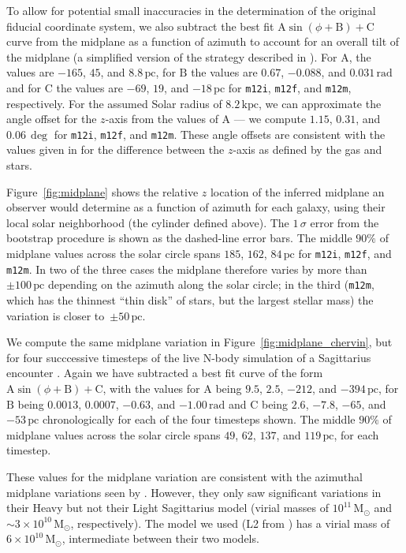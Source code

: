 \documentclass[twocolumn]{aastex62}
\newcommand{\Msun}{\ensuremath{\text{M}_\odot}}
\newcommand{\pc}{\text{pc}}
\newcommand{\kpc}{\text{kpc}}
\newcommand{\mi}{\texttt{m12i}}
\newcommand{\mf}{\texttt{m12f}}
\newcommand{\mm}{\texttt{m12m}}
\begin{document}
To allow for potential small inaccuracies in the determination of the original
fiducial coordinate system, we also subtract the best fit $\text{A}
\sin{\left(\phi + \text{B}\right)} + \text{C}$ curve from the midplane as a
function of azimuth to account for an overall tilt of the midplane (a
simplified version of the strategy described in
\citealt{2019ApJ...871..145A}). For $\text{A}$, the values are $-165$, $45$,
and $8.8\,\pc$, for $\text{B}$ the values are $0.67$, $-0.088$, and
$0.031\,\text{rad}$ and for $\text{C}$ the values are $-69$, $19$, and
$-18\,\pc$ for \mi{}, \mf{}, and \mm{}, respectively. For the assumed Solar
radius of $8.2\,\kpc$, we can approximate the angle offset for the $z$-axis
from the values of $\text{A}$ --- we compute $1.15$, $0.31$, and $0.06\,\deg$
for \mi{}, \mf{}, and \mm{}. These angle offsets are consistent with the
values given in \citet{2018arXiv180610564S} for the difference between the
$z$-axis as defined by the gas and stars.

Figure~\ref{fig:midplane} shows the relative $z$ location of the inferred
midplane an observer would determine as a function of azimuth for
each galaxy, using their local solar neighborhood (the cylinder defined
above). The
$1\,\sigma$ error from the bootstrap procedure is shown as the dashed-line
error bars. The middle $90\%$ of midplane values across the solar circle spans
$185$, $162$, $84\,\pc$ for \mi{}, \mf{}, and \mm{}. In two of the three cases
the midplane therefore varies by more than $\pm 100\,\pc$ depending on the
azimuth along the solar circle; in the third (\mm{}, which has the thinnest
``thin disk'' of stars, but the largest stellar mass) the variation is closer
to~$\pm 50\,\pc$.

We compute the same midplane variation in Figure~\ref{fig:midplane_chervin},
but for four succcessive timesteps of the live N-body simulation of a
Sagittarius encounter \citep{2018MNRAS.481..286L}. Again we have subtracted a
best fit curve of the form $\text{A} \sin{\left(\phi + \text{B}\right)} +
\text{C}$, with the values for $\text{A}$ being $9.5$, $2.5$, $-212$, and
$-394\,\pc$, for $\text{B}$ being $0.0013$, $0.0007$, $-0.63$, and
$-1.00\,\text{rad}$ and $\text{C}$ being $2.6$, $-7.8$, $-65$, and $-53\,\pc$
chronologically for each of the four timesteps shown. The middle $90\%$ of midplane values across the solar circle spans $49$, $62$, $137$, and $119\,\pc$, for each timestep.

These values for the midplane variation are consistent with the azimuthal
midplane variations seen by \citet{2013MNRAS.429..159G}. However, they only
saw significant variations in their Heavy but not their Light Sagittarius model (virial masses of $10^{11}\,\Msun$ and
$\sim3\times10^{10}\,\Msun$, respectively). The model we used (L2 from
\citet{2018MNRAS.481..286L}) has a virial mass of $6\times10^{10}\,\Msun$, intermediate between their two models.
\end{document}
